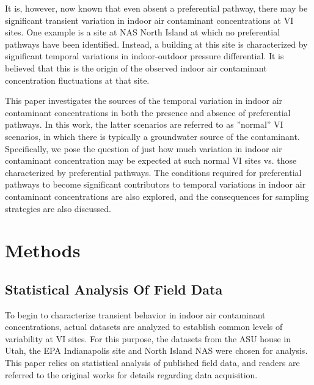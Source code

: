 \documentclass[journal=esthag,manuscript=article]{achemso}
\begin{document}
It is, however, now known that even absent a preferential pathway, there may be significant transient variation in indoor air contaminant concentrations at VI sites\cite{folkes_observed_2009,brenner_results_2010,johnston_spatiotemporal_2014}.
One example is a site at NAS North Island at which no preferential pathways have been identified.
Instead, a building at this site is characterized by significant temporal variations in indoor-outdoor pressure differential\cite{hosangadi_high-frequency_2017}.
It is believed that this is the origin of the observed indoor air contaminant concentration fluctuations at that site. \par

This paper investigates the sources of the temporal variation in indoor air contaminant concentrations in both the presence and absence of preferential pathways.
In this work, the latter scenarios are referred to as ”normal” VI scenarios, in which there is typically a groundwater source of the contaminant.
Specifically, we pose the question of just how much variation in indoor air contaminant concentration may be expected at  such normal  VI  sites vs. those characterized by preferential pathways.
The conditions required for preferential pathways to become significant contributors to temporal variations in indoor air contaminant concentrations are also explored, and the consequences for sampling strategies are also discussed.

\section{Methods}

\subsection{Statistical Analysis Of Field Data}

To begin to characterize transient behavior in indoor air contaminant concentrations, actual datasets are analyzed to establish common levels of variability at VI sites.
For this purpose, the datasets from the ASU house in Utah, the EPA Indianapolis site and North Island NAS were chosen for analysis.
This paper relies on statistical analysis of published field data, and readers are referred to the original works for details regarding data acquisition\cite{holton_evaluation_2015,guo_vapor_2015,holton_temporal_2013,hosangadi_high-frequency_2017,u.s._environmental_protection_agency_assessment_2015}. \par
\end{document}
